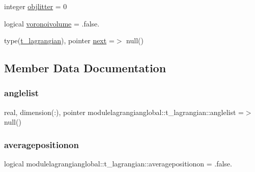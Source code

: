 \begin{DoxyCompactItemize}
\item 
integer \mbox{\hyperlink{structmodulelagrangianglobal_1_1t__lagrangian_a7013c1ff071bcee0dadc5cdf8b1cfa84}{objlitter}} = 0
\item 
logical \mbox{\hyperlink{structmodulelagrangianglobal_1_1t__lagrangian_a29d69647b66df86d9ca697b22ce4537f}{voronoivolume}} = .false.
\item 
type(\mbox{\hyperlink{structmodulelagrangianglobal_1_1t__lagrangian}{t\+\_\+lagrangian}}), pointer \mbox{\hyperlink{structmodulelagrangianglobal_1_1t__lagrangian_a3fbf03216a543c37ca18d86b91dd7d88}{next}} =$>$ null()
\end{DoxyCompactItemize}


\subsection{Member Data Documentation}
\mbox{\label{structmodulelagrangianglobal_1_1t__lagrangian_ad3e57b92dad44c2c703f394fb2577e1a}} 
\subsubsection{\texorpdfstring{anglelist}{anglelist}}
{\footnotesize\ttfamily real, dimension(\+:), pointer modulelagrangianglobal\+::t\+\_\+lagrangian\+::anglelist =$>$ null()\hspace{0.3cm}{\ttfamily [private]}}

\mbox{\label{structmodulelagrangianglobal_1_1t__lagrangian_ab1bc79c1222156ee71606d6e48f837c5}} 
\subsubsection{\texorpdfstring{averagepositionon}{averagepositionon}}
{\footnotesize\ttfamily logical modulelagrangianglobal\+::t\+\_\+lagrangian\+::averagepositionon = .false.\hspace{0.3cm}{\ttfamily [private]}}

